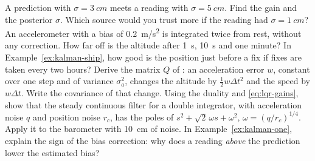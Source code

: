 \begin{exercises}
\exercise[1] A prediction with $\sigma = \SI{3}{cm}$ meets a reading with $\sigma = \SI{5}{cm}$. Find the gain and the posterior $\sigma$. Which source would you trust more if the reading had $\sigma = \SI{1}{cm}$?
\exercise[1] An accelerometer with a bias of \SI{0.2}{m/s^2} is integrated twice from rest, without any correction. How far off is the altitude after \SI{1}{s}, \SI{10}{s} and one minute?
\exercise[1] In Example~\ref{ex:kalman-ship}, how good is the position just before a fix if fixes are taken every two hours?
\exercise[2] Derive the matrix $Q$ of : an acceleration error $w$, constant over one step and of variance $\sigma_a^2$, changes the altitude by $\tfrac12w\Delta t^2$ and the speed by $w\Delta t$. Write the covariance of that change.
\exercise[2] Using the duality and \cref{eq:lqr-gains}, show that the steady continuous filter for a double integrator, with acceleration noise $q$ and position noise $r_c$, has the poles of $s^2 + \sqrt2\,\omega s + \omega^2$, $\omega = (q/r_c)^{1/4}$. Apply it to the barometer with \SI{10}{cm} of noise.
\exercise[2] In Example~\ref{ex:kalman-one}, explain the sign of the bias correction: why does a reading \emph{above} the prediction lower the estimated bias?

\end{exercises}
